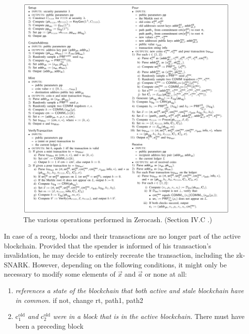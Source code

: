 \documentclass{article}
\begin{document}
\begin{figure}[H]
\includegraphics[width=\textwidth]{zerocash-zksnark.png}
\caption{The various operations performed in Zerocash. (Section IV.C \cite{bensasson:zerocash}.)} \label{fig:zerocash}
\centering
\end{figure}

In case of a reorg, blocks and their transactions are no longer part of the active blockchain.
Provided that the spender is informed of his transaction's invalidation, he may decide to entirely recreate the transaction, including the zk-SNARK.
However, depending on the following conditions, it might only be necessary to modify some elements of $\vec{x}$ and $\vec{a}$ or none at all:

\begin{enumerate}
        \item \textit{ references a state of the blockchain that both active and stale blockchain have in common.}
                if not, change rt, path1, path2
        \item \textit{$\text{c}_1^\text{old}$ and $\text{c}_2^\text{old}$ were in a block that is in the active blockchain.}
                There must have been a preceding block %
\end{enumerate}
\end{document}
